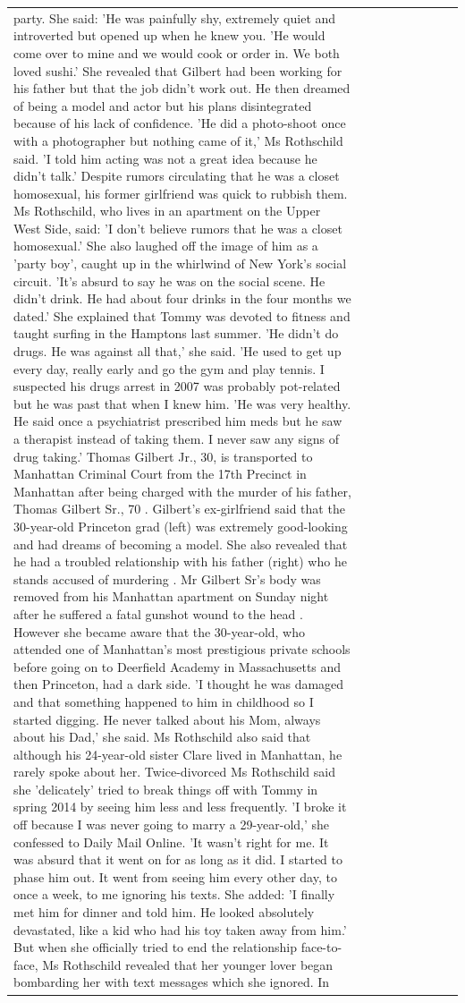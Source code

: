 \begin{table}[H]
\begin{tabular}{lllrlllll}
party. She said: 'He was painfully shy, extremely quiet and introverted but opened up when he knew you. 'He would come over to mine and we would cook or order in. We both loved sushi.' She revealed that Gilbert had been working for his father but that the job didn't work out. He then dreamed of being a model and actor but his plans disintegrated because of his lack of confidence. 'He did a photo-shoot once with a photographer but nothing came of it,' Ms Rothschild said. 'I told him acting was not a great idea because he didn’t talk.' Despite rumors circulating that he was a closet homosexual, his former girlfriend was quick to rubbish them. Ms Rothschild, who lives in an apartment on the Upper West Side, said: 'I don’t believe rumors that he was a closet homosexual.' She also laughed off the image of him as a 'party boy', caught up in the whirlwind of New York's social circuit. 'It’s absurd to say he was on the social scene. He didn’t drink. He had about four drinks in the four months we dated.' She explained that Tommy was devoted to fitness and taught surfing in the Hamptons last summer. 'He didn’t do drugs. He was against all that,' she said. 'He used to get up every day, really early and go the gym and play tennis. I suspected his drugs arrest in 2007 was probably pot-related but he was past that when I knew him. 'He was very healthy. He said once a psychiatrist prescribed him meds but he saw a therapist instead of taking them. I never saw any signs of drug taking.' Thomas Gilbert Jr., 30, is transported to Manhattan Criminal Court from the 17th Precinct in Manhattan after being charged with the murder of his father, Thomas Gilbert Sr., 70 . Gilbert's ex-girlfriend said that the 30-year-old Princeton grad (left) was extremely good-looking and had dreams of becoming a model. She also revealed that he had a troubled relationship with his father (right) who he stands accused of murdering . Mr Gilbert Sr's body was removed from his Manhattan apartment on Sunday night after he suffered a fatal gunshot wound to the head . However she became aware that the 30-year-old, who attended one of Manhattan's most prestigious private schools before going on to Deerfield Academy in Massachusetts and then Princeton, had a dark side. 'I thought he was damaged and that something happened to him in childhood so I started digging. He never talked about his Mom, always about his Dad,' she said. Ms Rothschild also said that although his 24-year-old sister Clare lived in Manhattan, he rarely spoke about her. Twice-divorced Ms Rothschild said she 'delicately' tried to break things off with Tommy in spring 2014 by seeing him less and less frequently. 'I broke it off because I was never going to marry a 29-year-old,' she confessed to Daily Mail Online. 'It wasn’t right for me. It was absurd that it went on for as long as it did. I started to phase him out. It went from seeing him every other day, to once a week, to me ignoring his texts. She added: 'I finally met him for dinner and told him. He looked absolutely devastated, like a kid who had his toy taken away from him.' But when she officially tried to end the relationship face-to-face, Ms Rothschild revealed that her younger lover began bombarding her with text messages which she ignored. In 
\end{tabular}
\end{table}
